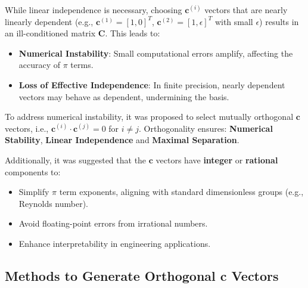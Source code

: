\documentclass[
	11pt, %
	fleqn, %
	a4paper, %
]{LegrandOrangeBook}
\begin{document}
While linear independence is necessary, choosing $\mathbf{c}^{(i)}$ vectors that are nearly linearly dependent (e.g., $\mathbf{c}^{(1)} = [1, 0]^T$, $\mathbf{c}^{(2)} = [1, \epsilon]^T$ with small $\epsilon$) results in an ill-conditioned matrix $\mathbf{C}$. This leads to:
\begin{itemize}
    \item \textbf{Numerical Instability}: Small computational errors amplify, affecting the accuracy of $\pi$ terms.
    \item \textbf{Loss of Effective Independence}: In finite precision, nearly dependent vectors may behave as dependent, undermining the basis.
\end{itemize}

To address numerical instability, it was proposed to select mutually orthogonal $\mathbf{c}$ vectors, i.e., $\mathbf{c}^{(i)} \cdot \mathbf{c}^{(j)} = 0$ for $i \neq j$. Orthogonality ensures:
\textbf{Numerical Stability}, \textbf{Linear Independence} and \textbf{Maximal Separation}.

Additionally, it was suggested that the $\mathbf{c}$ vectors have \textbf{integer} or \textbf{rational} components to:
\begin{itemize}
    \item Simplify $\pi$ term exponents, aligning with standard dimensionless groups (e.g., Reynolds number).
    \item Avoid floating-point errors from irrational numbers.
    \item Enhance interpretability in engineering applications.
\end{itemize}


\subsection{Methods to Generate Orthogonal c Vectors}
\end{document}
